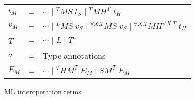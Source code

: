 \begin{figure}
\begin{center}
\begin{tabular}{lcl}
$t_{M}$ & = & $\cdots\;\vert\;^{T}MS\;t_{S}\;\vert\;^{T}MH^{T}\;t_{H}$ \\
$v_{M}$ & = & $\cdots\;\vert\;^{L}MS\;v_{S}\;\vert\;^{\forall X.T}MS\;v_{S}\;\vert\;^{\forall X.T}MH^{\forall X.T}\;t_{H}$ \\
$T$ & = & $\cdots\;\vert\;L\;\vert\;T^{a}$ \\
$a$ & = & Type annotations \\
$E_{M}$ & = & $\cdots\;\vert\;^{T}HM^{T}\;E_{M}\;\vert\;SM^{T}\;E_{M}$
\end{tabular}
\end{center}
\caption{ML interoperation terms}
\label{fig:mit}
\end{figure}